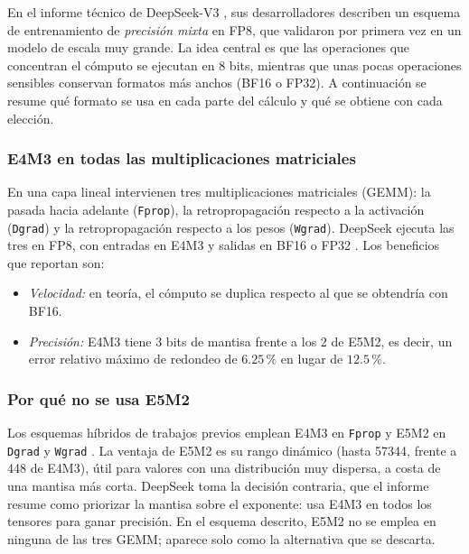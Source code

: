 \documentclass{article}
\begin{document}
      En el informe técnico de DeepSeek-V3 \cite{deepseek2024v3}, sus
      desarrolladores describen un esquema de entrenamiento de
      \emph{precisión mixta} en FP8, que validaron por primera vez en un
      modelo de escala muy grande. La idea central es que las operaciones
      que concentran el cómputo se ejecutan en 8 bits, mientras que unas
      pocas operaciones sensibles conservan formatos más anchos (BF16 o
      FP32). A continuación se resume qué formato se usa en cada parte del
      cálculo y qué se obtiene con cada elección.

      \subsubsection{E4M3 en todas las multiplicaciones matriciales}

        En una capa lineal intervienen tres multiplicaciones matriciales
        (GEMM): la pasada hacia adelante (\texttt{Fprop}), la
        retropropagación respecto a la activación (\texttt{Dgrad}) y la
        retropropagación respecto a los pesos (\texttt{Wgrad}). DeepSeek
        ejecuta las tres en FP8, con entradas en E4M3 y salidas en BF16 o
        FP32 \cite{deepseek2024v3}. Los beneficios que reportan son:

        \begin{itemize}
          \item \emph{Velocidad:} en teoría, el cómputo se duplica
            respecto al que se obtendría con BF16.

          \item \emph{Precisión:} E4M3 tiene 3 bits de mantisa frente a los
            2 de E5M2, es decir, un error relativo máximo de redondeo de
            $6.25\,\%$ en lugar de $12.5\,\%$.

        \end{itemize}

      \subsubsection{Por qué no se usa E5M2}

        Los esquemas híbridos de trabajos previos emplean E4M3 en
        \texttt{Fprop} y E5M2 en \texttt{Dgrad} y \texttt{Wgrad}
        \cite{deepseek2024v3,micikevicius2022fp8}. La ventaja de E5M2 es
        su rango dinámico (hasta 57344, frente a 448 de E4M3), útil para
        valores con una distribución muy dispersa, a costa de una
        mantisa más corta. DeepSeek toma la decisión contraria, que el
        informe resume como priorizar la mantisa sobre el exponente: usa
        E4M3 en todos los tensores para ganar precisión. En el esquema
        descrito, E5M2 no se emplea en ninguna de las tres GEMM; aparece
        solo como la alternativa que se descarta.
\end{document}
